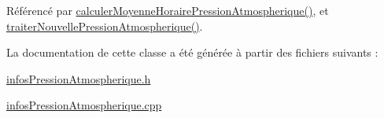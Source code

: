 Référencé par \hyperlink{class_infos_pression_atmospherique_a287f1f24726218868c8531365c1a22ec}{calculer\+Moyenne\+Horaire\+Pression\+Atmospherique()}, et \hyperlink{class_infos_pression_atmospherique_ab280f47f2a1376222a45fde8638489d2}{traiter\+Nouvelle\+Pression\+Atmospherique()}.



La documentation de cette classe a été générée à partir des fichiers suivants \+:\begin{DoxyCompactItemize}
\item 
\hyperlink{infos_pression_atmospherique_8h}{infos\+Pression\+Atmospherique.\+h}\item 
\hyperlink{infos_pression_atmospherique_8cpp}{infos\+Pression\+Atmospherique.\+cpp}\end{DoxyCompactItemize}
